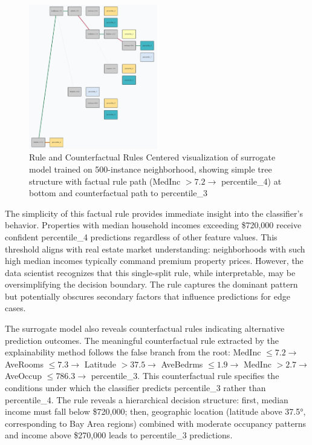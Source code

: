 \begin{figure}[ht]
\centering
\includegraphics[width=0.5\textwidth]{images/ds_Blocks_500.png}
\caption{Rule and Counterfactual Rules Centered visualization of surrogate model trained on 500-instance neighborhood, showing simple tree structure with factual rule path (MedInc $> 7.2 \rightarrow$ percentile\_4) at bottom and counterfactual path to percentile\_3}
\label{fig:ds_Blocks_500}
\end{figure}

The simplicity of this factual rule provides immediate insight into the classifier's behavior. Properties with median household incomes exceeding \$720,000 receive confident percentile\_4 predictions regardless of other feature values. This threshold aligns with real estate market understanding: neighborhoods with such high median incomes typically command premium property prices. However, the data scientist recognizes that this single-split rule, while interpretable, may be oversimplifying the decision boundary. The rule captures the dominant pattern but potentially obscures secondary factors that influence predictions for edge cases.

The surrogate model also reveals counterfactual rules indicating alternative prediction outcomes. The meaningful counterfactual rule extracted by the explainability method follows the false branch from the root: MedInc $\leq 7.2 \rightarrow$ AveRooms $\leq 7.3 \rightarrow$ Latitude $> 37.5 \rightarrow$ AveBedrms $\leq 1.9 \rightarrow$ MedInc $> 2.7 \rightarrow$ AveOccup $\leq 786.3 \rightarrow$ percentile\_3. This counterfactual rule specifies the conditions under which the classifier predicts percentile\_3 rather than percentile\_4. The rule reveals a hierarchical decision structure: first, median income must fall below \$720,000; then, geographic location (latitude above 37.5°, corresponding to Bay Area regions) combined with moderate occupancy patterns and income above \$270,000 leads to percentile\_3 predictions.

